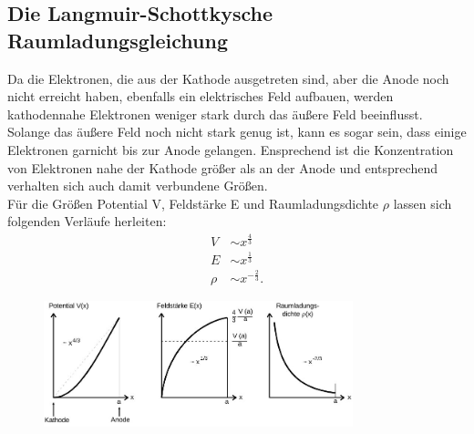 \subsection{Die Langmuir-Schottkysche Raumladungsgleichung}
Da die Elektronen, die aus der Kathode ausgetreten sind, aber die Anode noch nicht erreicht haben, ebenfalls ein elektrisches Feld aufbauen, werden kathodennahe Elektronen weniger stark durch das äußere Feld beeinflusst. Solange das äußere Feld noch nicht stark genug ist, kann es sogar sein, dass einige Elektronen garnicht bis zur Anode gelangen. Ensprechend ist die Konzentration von Elektronen nahe der Kathode größer als an der Anode und entsprechend verhalten sich auch damit verbundene Größen.\\
Für die Größen Potential V, Feldstärke E und Raumladungsdichte $\rho$ lassen sich folgenden Verläufe herleiten:
\begin{align*}
V  &\sim x^\frac{4}{3}\\
E  &\sim x^\frac{1}{3}\\
\rho  &\sim x^{-\frac{2}{3}}.
\end{align*}

\begin{figure}
\includegraphics[width=0.8\textwidth]{pics/raumladungsgebiet.jpg}
\label{raumladungsgebiet}
\end{figure}

